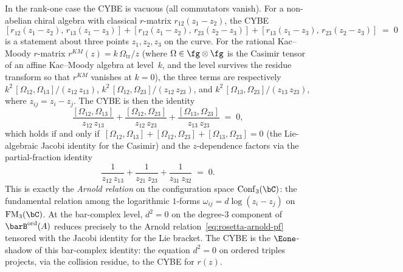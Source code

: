 \begin{remark}
\label{rem:rosetta-cybe-arnold}
In the rank-one case the CYBE is vacuous (all commutators vanish).
For a non-abelian chiral algebra with classical $r$-matrix
$r_{12}(z_1 - z_2)$, the CYBE
\begin{equation}\label{eq:rosetta-cybe-partial-fractions}
[r_{12}(z_1 - z_2),\, r_{13}(z_1 - z_3)]
+ [r_{12}(z_1 - z_2),\, r_{23}(z_2 - z_3)]
+ [r_{13}(z_1 - z_3),\, r_{23}(z_2 - z_3)]
\;=\; 0
\end{equation}
is a statement about three points $z_1, z_2, z_3$ on the curve.
For the rational Kac--Moody $r$-matrix
$r^{KM}(z) = k\,\Omega_{\mathrm{tr}}/z$
(where $\Omega \in \fg \otimes \fg$ is the Casimir tensor of an
affine Kac--Moody algebra at level~$k$, and the level survives
the residue transform so that $r^{KM}$ vanishes at $k = 0$), the three
terms are respectively
$k^2\,[\Omega_{12}, \Omega_{13}]/(z_{12}\,z_{13})$,
$k^2\,[\Omega_{12}, \Omega_{23}]/(z_{12}\,z_{23})$, and
$k^2\,[\Omega_{13}, \Omega_{23}]/(z_{13}\,z_{23})$, where
$z_{ij} = z_i - z_j$.
The CYBE is then the identity
\[
\frac{[\Omega_{12}, \Omega_{13}]}{z_{12}\,z_{13}}
+ \frac{[\Omega_{12}, \Omega_{23}]}{z_{12}\,z_{23}}
+ \frac{[\Omega_{13}, \Omega_{23}]}{z_{13}\,z_{23}}
\;=\; 0,
\]
which holds if and only if$\,$
$[\Omega_{12}, \Omega_{13}] + [\Omega_{12}, \Omega_{23}]
+ [\Omega_{13}, \Omega_{23}] = 0$
(the Lie-algebraic Jacobi identity for the Casimir)
and the $z$-dependence factors via the partial-fraction identity
\begin{equation}\label{eq:rosetta-arnold-pf}
\frac{1}{z_{12}\,z_{13}}
+ \frac{1}{z_{21}\,z_{23}}
+ \frac{1}{z_{31}\,z_{32}}
\;=\; 0.
\end{equation}
This is exactly the \emph{Arnold relation}
on the configuration space $\mathrm{Conf}_3(\bC)$:
the fundamental relation among the logarithmic
$1$-forms $\omega_{ij} = d\log(z_i - z_j)$ on
$\mathrm{FM}_3(\bC)$. At the bar-complex level,
$d^2 = 0$ on the degree-$3$ component of $\barB^{\mathrm{ord}}(A)$
reduces precisely to the Arnold
relation~\eqref{eq:rosetta-arnold-pf} tensored with the Jacobi
identity for the Lie bracket.
The CYBE is the $\Eone$-shadow of this bar-complex identity:
the equation $d^2 = 0$ on ordered triples projects, via
the collision residue, to the CYBE
for $r(z)$.
\end{remark}

